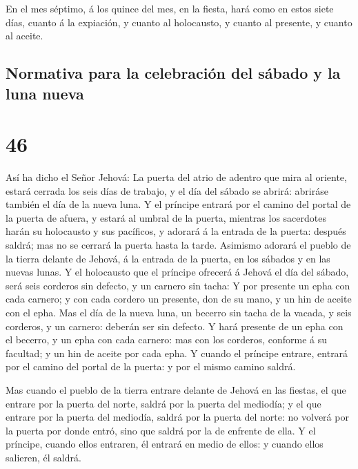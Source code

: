  En el mes séptimo, á los quince del mes, en la fiesta,
hará como en estos siete días, cuanto á la expiación, y cuanto al
holocausto, y cuanto al presente, y cuanto al aceite.

\hypertarget{normativa-para-la-celebraciuxf3n-del-suxe1bado-y-la-luna-nueva}{%
\subsection{Normativa para la celebración del sábado y la luna
nueva}\label{normativa-para-la-celebraciuxf3n-del-suxe1bado-y-la-luna-nueva}}

\hypertarget{section-45}{%
\section{46}\label{section-45}}

 Así ha dicho el Señor Jehová: La puerta del atrio de
adentro que mira al oriente, estará cerrada los seis días de trabajo, y
el día del sábado se abrirá: abriráse también el día de la nueva luna.
 Y el príncipe entrará por el camino del portal de la
puerta de afuera, y estará al umbral de la puerta, mientras los
sacerdotes harán su holocausto y sus pacíficos, y adorará á la entrada
de la puerta: después saldrá; mas no se cerrará la puerta hasta la
tarde.  Asimismo adorará el pueblo de la tierra delante de
Jehová, á la entrada de la puerta, en los sábados y en las nuevas lunas.
 Y el holocausto que el príncipe ofrecerá á Jehová el día
del sábado, será seis corderos sin defecto, y un carnero sin tacha:
 Y por presente un epha con cada carnero; y con cada
cordero un presente, don de su mano, y un hin de aceite con el epha.
 Mas el día de la nueva luna, un becerro sin tacha de la
vacada, y seis corderos, y un carnero: deberán ser sin defecto.
 Y hará presente de un epha con el becerro, y un epha con
cada carnero: mas con los corderos, conforme á su facultad; y un hin de
aceite por cada epha.  Y cuando el príncipe entrare,
entrará por el camino del portal de la puerta: y por el mismo camino
saldrá.

 Mas cuando el pueblo de la tierra entrare delante de
Jehová en las fiestas, el que entrare por la puerta del norte, saldrá
por la puerta del mediodía; y el que entrare por la puerta del mediodía,
saldrá por la puerta del norte: no volverá por la puerta por donde
entró, sino que saldrá por la de enfrente de ella.  Y el
príncipe, cuando ellos entraren, él entrará en medio de ellos: y cuando
ellos salieren, él saldrá.

